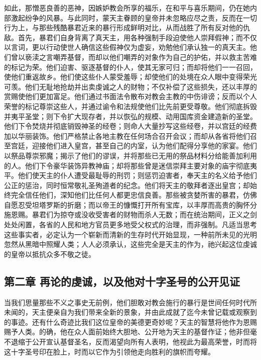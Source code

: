 如此，那憎恶良善的恶神，因嫉妒教会所享的福乐，在和平与喜乐期间，仍在她内部激起纷争的风暴。与此同时，蒙天主眷顾的皇帝并未忽略应尽之责，反而在一切行为上，与那些残酷暴君近来的暴行形成鲜明对比，从而战胜了所有反对他的仇敌。首先，暴君们自身背离了真天主，用各种强制手段迫使他人崇拜假神；而不仅以言词，更以行动使世人确信这些假神仅为虚妄，劝勉他们承认独一的真天主。他们曾以亵渎之言嘲弄基督，而却以他们嘲弄的对象作为自己的护佑，并以救主苦难的标记为荣。他们迫害、驱逐基督的仆人，使其无家可归；而却将他们一一召回，使他们重返故乡。他们使这些仆人蒙受羞辱；却使他们的处境在众人眼中变得荣光可羡。他们无耻地抢劫并出卖虔诚之人的财物；不仅补偿了这些损失，还以丰厚的赏赐使他们更加富足。他们通过书面法令散布对教会主教的中伤诽谤；反而以个人荣誉的标记尊崇这些人，并通过谕令和法规使他们比先前更受尊敬。他们彻底拆毁并夷平圣堂；则下令扩大现存者，并以恢弘的规模、动用国库资金建造新的圣堂。他们下令焚烧并彻底销毁神圣的经卷；则命人大量抄写这些经卷，并以宫廷的经费加以华丽装饰。他们严格禁止各地主教在任何场合召开会议；而却从各省将他们召至宫廷，迎接他们进入皇宫，甚至自己的内室，认为他们配得分享他的家宴。他们以祭品尊崇邪魔；揭示了他们的谬误，并将那些已无用的祭品材料分给能善加利用的人。他们下令豪华装饰异教神庙；却将那些曾是迷信崇拜主要对象的庙宇彻底夷平。他们使天主的仆人遭受最耻辱的刑罚；则惩罚迫害者，奉天主的名义给予他们公正的惩治，同时恒常敬礼圣殉道者的纪念。他们将天主的敬拜者逐出皇宫；却始终完全信任他们，深知他们比任何人都更忠信良善。那些被贪婪所害的暴君，仿佛自愿忍受坦塔罗斯的折磨；而以帝王的慷慨打开所有宝库，以丰厚而高贵的胸怀分施恩赐。暴君们为掠夺或没收受害者的财物而杀人无数；而在统治期间，正义之剑处处闲置，各省的人民和地方官员更多地受父权式的治理，而非强制。凡适当思考这些事实者，必定认为一个崭新而清新的生存时代开始显现，一种前所未见的光明忽然从黑暗中照耀人类；人人必须承认，这些完全是天主的作为，祂兴起这位虔诚的皇帝以抵抗众多不敬之徒。\par


\subsection{第二章 再论的虔诚，以及他对十字圣号的公开见证}

当我们思量那些不义之事史无前例，他们胆敢对教会施行的暴行是世间任何时代所未闻的，天主便亲自为我们带来全新的景象，并由此成就了迄今未曾记载或观察到的事迹。还有什么奇迹比我们这位皇帝的美德更奇妙呢？天主的智慧将他作为恩赐赐予人类。的确，他在众人面前始终大胆地、公开地为天主的基督作证；他非但毫不退缩于公开宣认基督圣名，反而渴望向所有人表明，他视此为最高荣誉，时而将这十字圣号印在脸上，时而以它作为引领他走向胜利的旗帜而夸耀。\par

